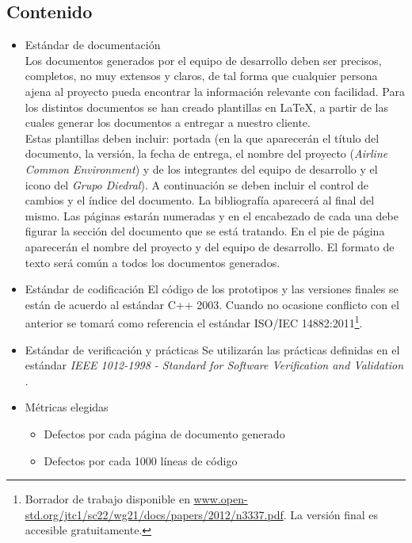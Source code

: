 \documentclass[11pt, a4paper, twoside, titlepage]{article}
\begin{document}
		\subsection{Contenido}
			\begin{itemize}
				\item Estándar de documentación\\
					Los documentos generados por el equipo de desarrollo deben ser precisos, completos, no muy extensos y claros, de tal forma que cualquier persona ajena al proyecto pueda encontrar la información relevante con facilidad. %
Para los distintos documentos se han creado plantillas en {\rmfamily\LaTeX{}}, a partir de las cuales generar los documentos a entregar a nuestro cliente.\\
					Estas plantillas deben incluir: portada (en la que aparecerán el título del documento, la versión, la fecha de entrega, el nombre del proyecto (\textit{Airline Common Environment}) y de los integrantes del equipo de desarrollo y el icono del \textit{Grupo Diedral}). A continuación se deben incluir el control de cambios y el índice del documento. La bibliografía aparecerá al final del mismo. Las páginas estarán numeradas y en el encabezado de cada una debe figurar la sección del documento que se está tratando. En el pie de página aparecerán el nombre del proyecto y del equipo de desarrollo. El formato de texto será común a todos los documentos generados.

				\item Estándar de  codificación %
					El código de los prototipos y las versiones finales se están de acuerdo al estándar C++ 2003. Cuando no ocasione conflicto con el anterior se tomará como referencia el estándar ISO/IEC 14882:2011\footnote{Borrador de trabajo disponible en \url{www.open-std.org/jtc1/sc22/wg21/docs/papers/2012/n3337.pdf}. La versión final es accesible gratuitamente.}.
					
				\item Estándar de verificación y prácticas
					Se utilizarán las prácticas definidas en el estándar \textit{IEEE 1012-1998 - Standard for Software Verification and Validation} \cite{IEEE1012-1998}.

				\item Métricas elegidas
					\begin{itemize}
						\item Defectos por cada página de documento generado
						\item Defectos por cada 1000 líneas de código
					\end{itemize}
			\end{itemize}
\end{document}
